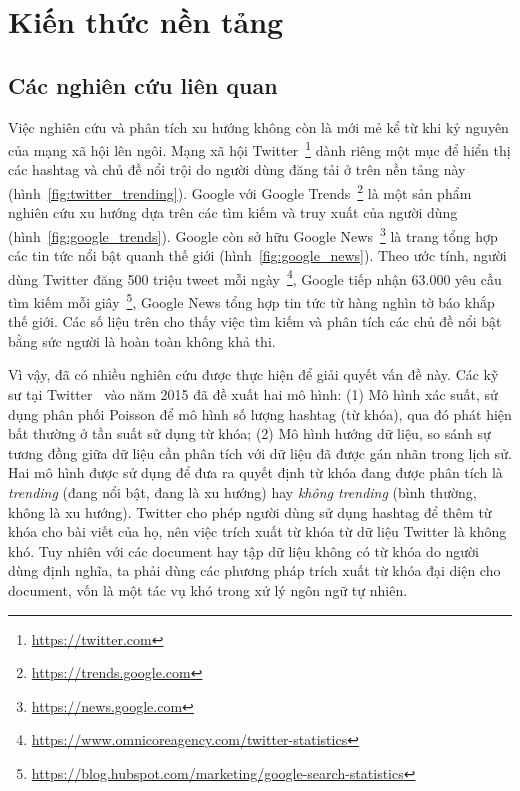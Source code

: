 \chapter{Kiến thức nền tảng}
\label{chap:knowledgebase}

\section{Các nghiên cứu liên quan}
\label{chap:relatedworks}

Việc nghiên cứu và phân tích xu hướng không còn là mới mẻ kể từ khi kỷ nguyên của mạng xã hội lên ngôi. Mạng xã hội Twitter~\footnote{\url{https://twitter.com}} dành riêng một mục để hiển thị các hashtag và chủ đề nổi trội do người dùng đăng tải ở trên nền tảng này (hình~\ref{fig:twitter_trending}). Google với Google Trends~\footnote{\url{https://trends.google.com}} là một sản phẩm nghiên cứu xu hướng dựa trên các tìm kiếm và truy xuất của người dùng (hình~\ref{fig:google_trends}). Google còn sở hữu Google News~\footnote{\url{https://news.google.com}} là trang tổng hợp các tin tức nổi bật quanh thế giới (hình~\ref{fig:google_news}). Theo ước tính, người dùng Twitter đăng 500 triệu tweet mỗi ngày~\footnote{\url{https://www.omnicoreagency.com/twitter-statistics}}, Google tiếp nhận 63.000 yêu cầu tìm kiếm mỗi giây~\footnote{\url{https://blog.hubspot.com/marketing/google-search-statistics}}, Google News tổng hợp tin tức từ hàng nghìn tờ báo khắp thế giới. Các số liệu trên cho thấy việc tìm kiếm và phân tích các chủ đề nổi bật bằng sức người là hoàn toàn không khả thi.




Vì vậy, đã có nhiều nghiên cứu được thực hiện để giải quyết vấn đề này. Các kỹ sư tại Twitter~\cite{hendricksonTrendDetectionSocial2015} vào năm 2015 đã đề xuất hai mô hình: (1) Mô hình xác suất, sử dụng phân phối Poisson để mô hình số lượng hashtag (từ khóa), qua đó phát hiện bất thường ở tần suất sử dụng từ khóa; (2) Mô hình hướng dữ liệu, so sánh sự tương đồng giữa dữ liệu cần phân tích với dữ liệu đã được gán nhãn trong lịch sử. Hai mô hình được sử dụng để đưa ra quyết định từ khóa đang được phân tích là \textit{trending} (đang nổi bật, đang là xu hướng) hay \textit{không trending} (bình thường, không là xu hướng). Twitter cho phép người dùng sử dụng hashtag để thêm từ khóa cho bài viết của họ, nên việc trích xuất từ khóa từ dữ liệu Twitter là không khó. Tuy nhiên với các \acrfull{document} hay tập dữ liệu không có từ khóa do người dùng định nghĩa, ta phải dùng các phương pháp trích xuất từ khóa đại diện cho \acrshort{document}, vốn là một tác vụ khó trong xử lý ngôn ngữ tự nhiên.

